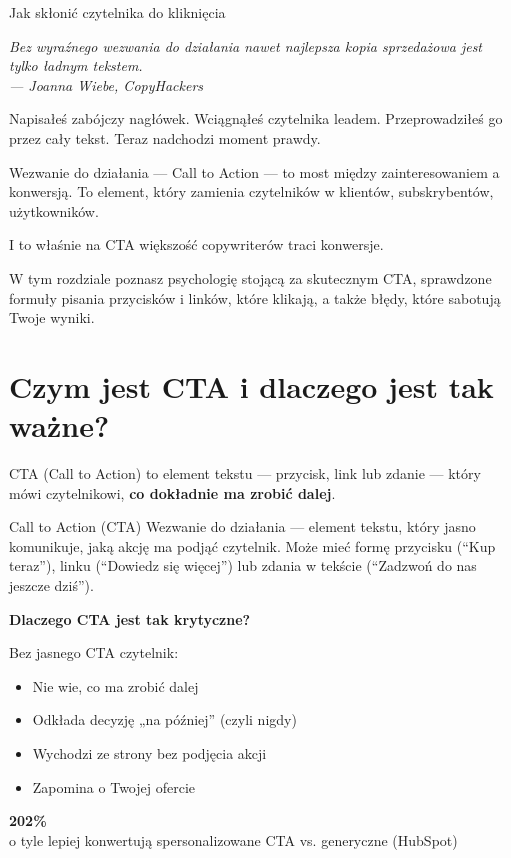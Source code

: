 \documentclass[
  12pt,
  a4paper,
  twoside,
  openright,
  12pt,
  DIV=12,
  BCOR=12mm]{scrbook}
\providecommand{\tightlist}{%
  \setlength{\itemsep}{0pt}\setlength{\parskip}{0pt}}\usepackage{longtable,booktabs,array}
\newcommand{\chapteropener}[1]{%
  \begin{center}
    \large\itshape\color{textmuted}#1
  \end{center}
  \vspace{1em}
}
\newcommand{\stathighlight}[2]{%
  \begin{center}
    \begin{tcolorbox}[
      enhanced,
      colback=primarylight,
      colframe=primaryblue,
      boxrule=1pt,
      arc=5pt,
      width=0.6\textwidth,
      halign=center
    ]
      {\fontsize{36}{40}\selectfont\bfseries\color{primarydark}#1}\\[5pt]
      {\color{textmuted}#2}
    \end{tcolorbox}
  \end{center}
}
\begin{document}
Jak skłonić czytelnika do kliknięcia

\hfill\break

\chapteropener{Bez wyraźnego wezwania do działania nawet najlepsza kopia sprzedażowa jest tylko ładnym tekstem.\\--- Joanna Wiebe, CopyHackers}

Napisałeś zabójczy nagłówek. Wciągnąłeś czytelnika leadem.
Przeprowadziłeś go przez cały tekst. Teraz nadchodzi moment prawdy.

Wezwanie do działania --- Call to Action --- to most między
zainteresowaniem a konwersją. To element, który zamienia czytelników w
klientów, subskrybentów, użytkowników.

I to właśnie na CTA większość copywriterów traci konwersje.

W tym rozdziale poznasz psychologię stojącą za skutecznym CTA,
sprawdzone formuły pisania przycisków i linków, które klikają, a także
błędy, które sabotują Twoje wyniki.

\section{Czym jest CTA i dlaczego jest tak
ważne?}\label{czym-jest-cta-i-dlaczego-jest-tak-waux17cne}

CTA (Call to Action) to element tekstu --- przycisk, link lub zdanie ---
który mówi czytelnikowi, \textbf{co dokładnie ma zrobić dalej}.

\begin{pojecie}{Call to Action (CTA)}
Wezwanie do działania --- element tekstu, który jasno komunikuje, jaką akcję ma podjąć czytelnik. Może mieć formę przycisku (``Kup teraz''), linku (``Dowiedz się więcej'') lub zdania w tekście (``Zadzwoń do nas jeszcze dziś'').
\end{pojecie}

\textbf{Dlaczego CTA jest tak krytyczne?}

Bez jasnego CTA czytelnik:

\begin{itemize}
\tightlist
\item
  Nie wie, co ma zrobić dalej
\item
  Odkłada decyzję „na później'' (czyli nigdy)
\item
  Wychodzi ze strony bez podjęcia akcji
\item
  Zapomina o Twojej ofercie
\end{itemize}

\stathighlight{202\%}{o tyle lepiej konwertują spersonalizowane CTA vs. generyczne (HubSpot)}
\end{document}

